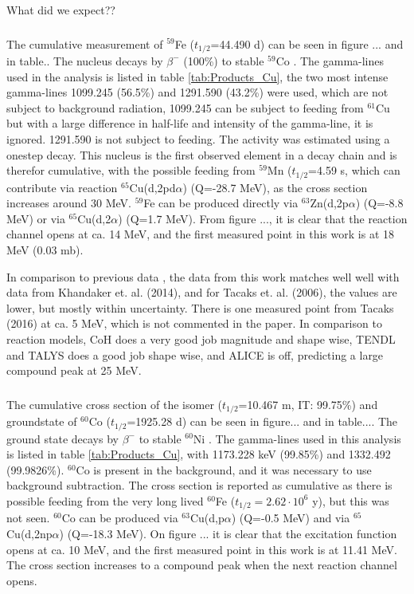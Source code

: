 What did we expect?? 



\subsubsection{}
The cumulative measurement of $^{59}$Fe ($t_{1/2}$=44.490 d) can be seen in figure ... and in table.. The nucleus decays by $\beta^-$ (100\%) to stable $^{59}$Co \cite{Basunia2018}. The gamma-lines used in the analysis is listed in table \ref{tab:Products_Cu}, the two most intense gamma-lines 1099.245 (56.5\%) and 1291.590 (43.2\%) were used, which are not subject to background radiation, 1099.245 can be subject to feeding from $^{61}$Cu but with a large difference in half-life and intensity of the gamma-line, it is ignored.  1291.590 is not subject to feeding. The activity was estimated using a onestep decay. This nucleus is the first observed element in a decay chain and is therefor cumulative, with the possible feeding from $^{59}$Mn ($t_{1/2}$=4.59 s, which can contribute via reaction $^{65}$Cu(d,2pd$\alpha$) (Q=-28.7 MeV), as the cross section increases around 30 MeV. $^{59}$Fe can be produced directly via $^{63}$Zn(d,2p$\alpha$) (Q=-8.8 MeV) or via $^{65}$Cu(d,2$\alpha$) (Q=1.7 MeV). From figure ..., it is clear that the reaction channel opens at ca. 14 MeV, and the first measured point in this work is at 18 MeV (0.03 mb). 

In comparison to previous data \cite{Khandaker2014, Takacs2006a}, the data from this work matches well well with data from Khandaker et. al. (2014), and for Tacaks et. al. (2006), the values are lower, but mostly within uncertainty. There is one measured point from Tacaks (2016) at ca. 5 MeV, which is not commented in the paper. In comparison to reaction models, CoH does a very good job magnitude and shape wise, TENDL and TALYS does a good job shape wise, and ALICE is off, predicting a large compound peak at 25 MeV. 

\subsubsection{}
The cumulative cross section of the isomer ($t_{1/2}$=10.467 m, IT: 99.75\%) and groundstate of $^{60}$Co ($t_{1/2}$=1925.28 d) can be seen in figure... and in table.... The ground state decays by $\beta^-$ to stable $^{60}$Ni \cite{Browne2013}. The gamma-lines used in this analysis is listed in table \ref{tab:Products_Cu}, with 1173.228 keV (99.85\%) and 1332.492 (99.9826\%). $^{60}$Co is present in the background, and it was necessary to use background subtraction. The cross section is reported as cumulative as there is possible feeding from the very long lived $^{60}$Fe ($t_{1/2}=2.62\cdot10^6$ y), but this was not seen. $^{60}$Co can  be produced via $^{63}$Cu(d,p$\alpha$) (Q=-0.5 MeV) and via $^{65}$Cu(d,2np$\alpha$) (Q=-18.3 MeV). On figure ... it is clear that the excitation function opens at ca. 10 MeV, and the first  measured point in this work is at 11.41 MeV. The cross section increases to a compound peak when the next reaction channel opens.  \\ 

